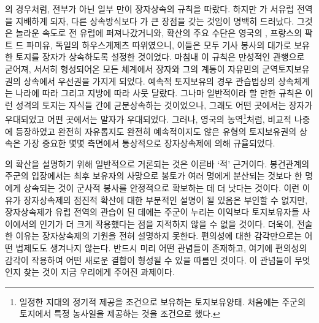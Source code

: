 의 경우처럼,
전부가 아닌 일부 만이 장자상속의 규칙을 따랐다.
하지만 가 서유럽 전역을 지배하게 되자,
다른 상속방식보다 가 큰 장점을 갖는 것임이 명백히 드러났다.
그것은 놀라운 속도로 전 유럽에 퍼져나갔거니와,
확산의 주요 수단은 영국의 ,
프랑스의 팍트 드 파미유,
독일의 하우스게제츠 따위였으니,
이들은 모두 기사 봉사의 대가로 보유한 토지를
장자가 상속하도록 설정한 것이었다.
마침내 이 규칙은 만성적인 관행으로 굳어져,
서서히 형성되어온 모든  체계에서
장자와 그의 계통이
자유민의
군역토지보유권의 상속에서 우선권을 가지게 되었다.
예속적 토지보유의 경우 
관습법상의 상속체계는 나라에 따라 그리고 지방에 따라 사뭇 달랐다.
그나마 일반적이라 할 만한 규칙은 이런 성격의 토지는 자식들 간에
균분상속하는 것이었으나, 그래도 어떤 곳에서는
장자가 우대되었고 어떤 곳에서는 말자가 우대되었다.
그러나,
영국의 농역\footnote{%
  일정한 지대의 정기적 제공을 조건으로 보유하는 토지보유양태.
  처음에는 주군의 토지에서 특정 농사일을 제공하는 것을 조건으로 했다.
}처럼,
비교적 나중에 등장하였고 완전히 자유롭지도 완전히 예속적이지도 않은
유형의 토지보유권의 상속은 가장 중요한 몇몇 측면에서
통상적으로 장자상속제에 의해 규율되었다.

의 확산을 설명하기 위해 일반적으로 거론되는 것은
이른바 `적' 근거이다.
봉건관계의 주군의 입장에서는
최후 보유자의 사망으로
봉토가
여러 명에게 분산되는 것보다
한 명에게 상속되는 것이 군사적 봉사를 안정적으로 확보하는 데
더 낫다는 것이다.
이런 이유가 장자상속제의 점진적 확산에 대한 부분적인 설명이 될 있음은
부인할 수 없지만,
장자상속제가 유럽 전역의 관습이 된 데에는
주군이 누리는 이익보다 토지보유자들 사이에서의 인기가 더 크게
작용했다는 점을
지적하지 않을 수 없을 것이다.
더욱이, 전술한 이유는 장자상속제의 기원을 전혀 설명하지 못한다.
편의성에 대한 감각만으로는 어떤 법제도도 생겨나지 않는다.
반드시 미리 어떤 관념들이 존재하고, 여기에 편의성의 감각이 작용하여
어떤 새로운 결합이 형성될 수 있을 따름인 것이다.
이 관념들이 무엇인지 찾는 것이 지금 우리에게 주어진 과제이다.

